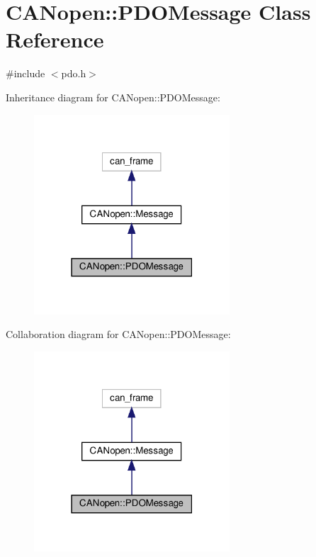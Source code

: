\hypertarget{class_c_a_nopen_1_1_p_d_o_message}{}\section{C\+A\+Nopen\+:\+:P\+D\+O\+Message Class Reference}
\label{class_c_a_nopen_1_1_p_d_o_message}


{\ttfamily \#include $<$pdo.\+h$>$}



Inheritance diagram for C\+A\+Nopen\+:\+:P\+D\+O\+Message\+:\nopagebreak
\begin{figure}[H]
\begin{center}
\leavevmode
\includegraphics[width=207pt]{class_c_a_nopen_1_1_p_d_o_message__inherit__graph}
\end{center}
\end{figure}


Collaboration diagram for C\+A\+Nopen\+:\+:P\+D\+O\+Message\+:\nopagebreak
\begin{figure}[H]
\begin{center}
\leavevmode
\includegraphics[width=207pt]{class_c_a_nopen_1_1_p_d_o_message__coll__graph}
\end{center}
\end{figure}
